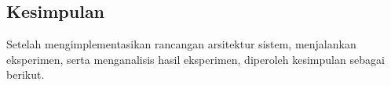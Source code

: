 \chapter{\babEnam}

\section{Kesimpulan}
Setelah mengimplementasikan rancangan arsitektur sistem, menjalankan eksperimen, serta menganalisis hasil eksperimen, diperoleh kesimpulan sebagai berikut.

